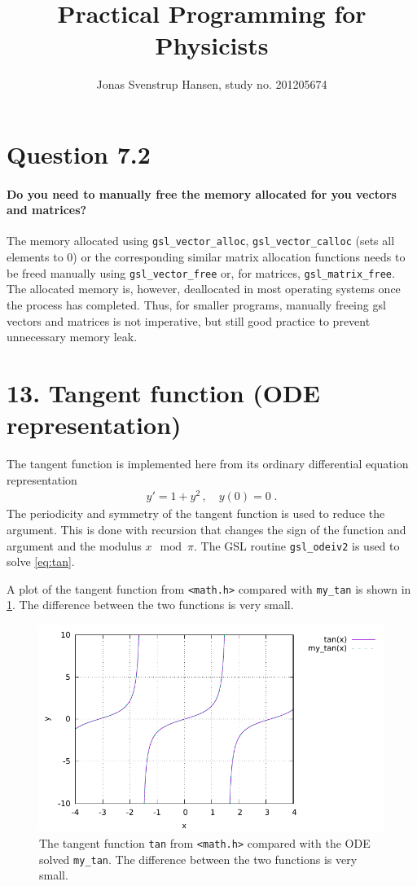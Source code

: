 \documentclass[12pt,twocolumn]{article}
\title{Practical Programming for Physicists}
\author{Jonas Svenstrup Hansen, study no. 201205674}
\begin{document}
\maketitle

\section*{Question 7.2}
\paragraph*{Do you need to manually free the memory allocated for you vectors and matrices?}
The memory allocated using \texttt{gsl\_vector\_alloc}, \texttt{gsl\_vector\_calloc} (sets all elements to 0) or the corresponding similar matrix allocation functions needs to be freed manually using \texttt{gsl\_vector\_free} or, for matrices, \texttt{gsl\_matrix\_free}.
The allocated memory is, however, deallocated in most operating systems once the process has completed.
Thus, for smaller programs, manually freeing gsl vectors and matrices is not imperative, but still good practice to prevent unnecessary memory leak.
\newpage

\section*{13. Tangent function (ODE representation)}
The tangent function is implemented here from its ordinary differential equation representation
\begin{align}
	y' = 1 + y^2 \, , \quad y(0) = 0\;.
	\label{eq:tan}
\end{align}
The periodicity and symmetry of the tangent function is used to reduce the argument. 
This is done with recursion that changes the sign of the function and argument and the modulus $x\mod\pi$.
The GSL routine \texttt{gsl\_odeiv2} is used to solve \cref{eq:tan}.

A plot of the tangent function from \texttt{<math.h>} compared with \texttt{my\_tan} is shown in \cref{fig:tan}.
The difference between the two functions is very small.
\begin{figure}
\includegraphics[width=\textwidth]{plot.pdf}
\caption{The tangent function \texttt{tan} from \texttt{<math.h>} compared with the ODE solved \texttt{my\_tan}. 
The difference between the two functions is very small.}
\label{fig:tan}
\end{figure}
\end{document}
